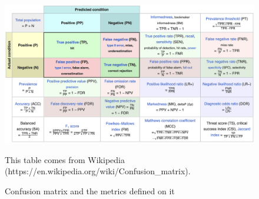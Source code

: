 \begin{figure}[htpb]
    \centering
    \includegraphics[width=\textwidth]{figs/confusionmtx.png}
    \caption{Confusion matrix and the metrics defined on it}
    {\footnotesize This table comes from Wikipedia (https://en.wikipedia.org/wiki/Confusion\_matrix).}
    \label{fig:confusionmtx}
\end{figure}
